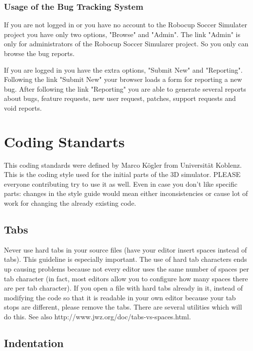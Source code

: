 \subsubsection{Usage of the Bug Tracking System}

If you are not logged in or you have no account to the Robocup Soccer Simulater project
you have only two options, "Browse" and "Admin". The link "Admin" is only for administrators of the
Robocup Soccer Simularer project. So you only can browse the bug reports.

If you are logged in you have the extra options, "Submit New" and "Reporting".
Following the link "Submit New" your browser loads a form for reporting a new bug.
After following the link "Reporting" you are able to generate several reports about
bugs, feature requests, new user request, patches, support requests and void reports.

\section{Coding Standarts}

This coding standards were defined by Marco K\"{o}gler from Universit\"{a}t Koblenz.\\

This is the coding style used for the initial parts of the 3D simulator. PLEASE everyone contributing try to use it as well. Even in case you don't like specific parts: changes in the style guide would mean either inconsistencies or cause lot of work for changing the already existing code. 

\subsection{Tabs}

Never use hard tabs in your source files (have your editor insert spaces instead of tabs). This guideline is especially important. The use of hard tab characters ends up causing problems because not every editor uses the same number of spaces per tab character (in fact, most editors allow you to configure how many spaces there are per tab character). If you open a file with hard tabs already in it, instead of modifying the code so that it is readable in your own editor because your tab stops are different, please remove the tabs. There are several utilities which will do this. See also http://www.jwz.org/doc/tabs-vs-spaces.html.

\subsection{Indentation}

